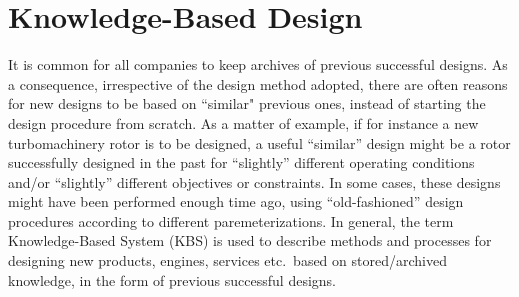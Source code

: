 \chapter{Knowledge-Based Design} %

\ifpdf
    \graphicspath{{3/figures/PNG/}{3ures/PDF/}{2.5/figures/}}
\else
    \graphicspath{{3/figures/EPS/}{3/figures/}}
\fi



\label{KBDchapter}
It is common for all companies to keep archives of previous successful designs. As a consequence, irrespective of the design method adopted, there are often reasons for new designs to be based on ``similar" previous ones, instead of starting the design procedure from scratch. As a matter of example, if for instance a new turbomachinery rotor is to be designed, a useful ``similar'' design might be a rotor successfully  designed in the past for ``slightly'' different operating conditions and/or ``slightly'' different objectives or constraints. 
In some cases, these designs might have been performed enough time ago, using ``old-fashioned'' design procedures according to different paremeterizations. In general, the term Knowledge-Based System (KBS) \cite{Akerkar:2009:KS:1795845} is used to describe methods and processes for designing new products, engines, services etc.\ based on stored/archived knowledge, in the form of previous successful designs.                

